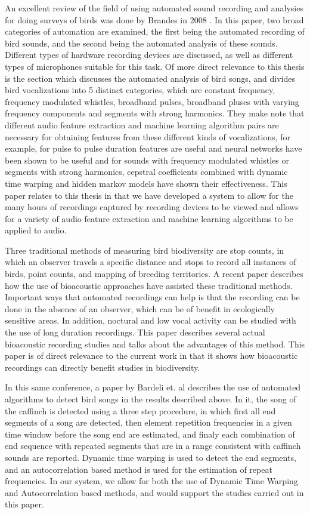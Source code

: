\documentclass[12pt,oneside]{book}
\begin{document}
An excellent review of the field of using automated sound recording
and analysies for doing surveys of birds was done by Brandes in 2008
\cite{brandes08}.  In this paper, two broad categories of automation
are examined, the first being the automated recording of bird sounds,
and the second being the automated analysis of these sounds.
Different types of hardware recording devices are discussed, as well
as different types of microphones suitable for this task.  Of more
direct relevance to this thesis is the section which discusses the
automated analysis of bird songs, and divides bird vocalizations into
5 distinct categories, which are constant frequency, frequency
modulated whistles, broadband pulses, broadband pluses with varying
frequency components and segments with strong harmonics.  They make
note that different audio feature extraction and machine learning
algorithm pairs are necessary for obtaining features from these
different kinds of vocalizations, for example, for pulse to pulse
duration features are useful and neural networks have been shown to be
useful and for sounds with frequency modulated whistles or segments
with strong harmonics, cepstral coefficients combined with dynamic
time warping and hidden markov models have shown their effectiveness.
This paper relates to this thesis in that we have developed a system
to allow for the many hours of recordings captured by recording
devices to be viewed and allows for a variety of audio feature
extraction and machine learning algorithms to be applied to audio.

Three traditional methods of measuring bird biodiversity are stop
counts, in which an observer travels a specific distance and stops to
record all instances of birds, point counts, \cite{bardeli10} and
mapping of breeding territories.  A recent paper \cite{frommolt08}
describes how the use of bioacoustic approaches have assisted these
traditional methods.  Important ways that automated recordings can
help is that the recording can be done in the absence of an observer,
which can be of benefit in ecologically sensitive areas.  In addition,
noctural and low vocal activity can be studied with the use of long
duration recordings.  This paper describes several actual bioacoustic
recording studies and talks about the advantages of this method.  This
paper is of direct relevance to the current work in that it shows how
bioacoustic recordings can directly benefit studies in biodiversity.

In this same conference, a paper by Bardeli et. al \cite{bardeli08}
describes the use of automated algorithms to detect bird songs in the
results described above.  In it, the song of the caffinch is detected
using a three step procedure, in which first all end segments of a
song are detected, then element repetition frequencies in a given time
window before the song end are estimated, and finaly each combination
of end sequence with repeated segments that are in a range consistent
with caffinch sounds are reported.  Dynamic time warping is used to
detect the end segments, and an autocorrelation based method is used
for the estimation of repeat frequencies.  In our system, we allow for
both the use of Dynamic Time Warping and Autocorrelation based
methods, and would support the studies carried out in this paper.
\end{document}
